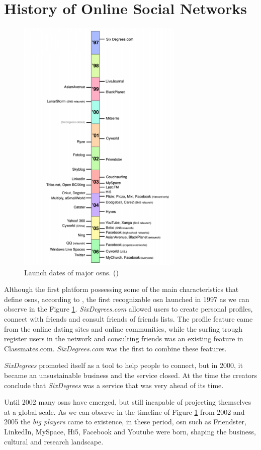 \section{History of Online Social Networks}
\begin{figure}[h!]
\begin{center}
  \includegraphics[width=0.7\textwidth]{img/timeline.png}
\end{center}
\caption{\label{img:timeline} Launch dates of major \glspl{osn}. (\cite{ellison2007social})}
\end{figure}

Although the first platform possessing some of the main characteristics that define \glspl{osn},
according to \cite{ellison2007social}, the first recognizable \gls{osn} launched in 1997 as we can observe in the Figure \ref{img:timeline}. \textit{SixDegrees.com} allowed users to create personal
profiles, connect with friends and consult friends of friends lists. The profile feature came from the
online dating sites and online communities, while the surfing trough register users in the network
and consulting friends was an existing feature in Classmates.com. \textit{SixDegrees.com} was the first to combine
these features.

\textit{SixDegrees} promoted itself as a tool to help people to connect, but in 2000, it became an
unsustainable business and the service closed. At the time the creators conclude that
\textit{SixDegrees} was a service that was very ahead of its time.

Until 2002 many \glspl{osn} have emerged, but still incapable of projecting themselves at a global scale.
As we can observe in the timeline of Figure \ref{img:timeline} from 2002 and 2005 the \textit{big players} came to existence, in these period, \gls{osn}
such as Friendster, LinkedIn, MySpace, Hi5, Facebook and Youtube were born, shaping the business, cultural
and research landscape.
